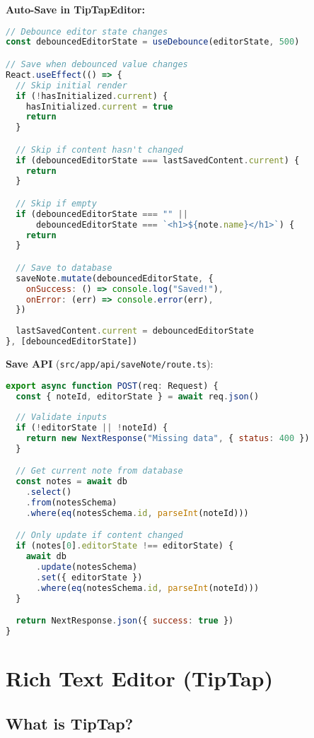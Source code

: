 \documentclass[11pt,a4paper]{article}
\begin{document}
\textbf{Auto-Save in TipTapEditor:}

\begin{lstlisting}[language=JavaScript]
// Debounce editor state changes
const debouncedEditorState = useDebounce(editorState, 500)

// Save when debounced value changes
React.useEffect(() => {
  // Skip initial render
  if (!hasInitialized.current) {
    hasInitialized.current = true
    return
  }

  // Skip if content hasn't changed
  if (debouncedEditorState === lastSavedContent.current) {
    return
  }

  // Skip if empty
  if (debouncedEditorState === "" || 
      debouncedEditorState === `<h1>${note.name}</h1>`) {
    return
  }

  // Save to database
  saveNote.mutate(debouncedEditorState, {
    onSuccess: () => console.log("Saved!"),
    onError: (err) => console.error(err),
  })
  
  lastSavedContent.current = debouncedEditorState
}, [debouncedEditorState])
\end{lstlisting}

\textbf{Save API} (\texttt{src/app/api/saveNote/route.ts}):

\begin{lstlisting}[language=JavaScript]
export async function POST(req: Request) {
  const { noteId, editorState } = await req.json()
  
  // Validate inputs
  if (!editorState || !noteId) {
    return new NextResponse("Missing data", { status: 400 })
  }

  // Get current note from database
  const notes = await db
    .select()
    .from(notesSchema)
    .where(eq(notesSchema.id, parseInt(noteId)))

  // Only update if content changed
  if (notes[0].editorState !== editorState) {
    await db
      .update(notesSchema)
      .set({ editorState })
      .where(eq(notesSchema.id, parseInt(noteId)))
  }

  return NextResponse.json({ success: true })
}
\end{lstlisting}


\section{Rich Text Editor (TipTap)}

\subsection{What is TipTap?}
\end{document}
